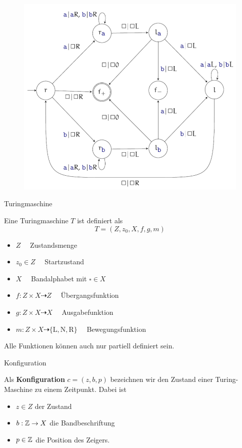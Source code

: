 \begin{frame}
	\vspace{-30pt}
	\begin{figure}[H]
		\centering
		\includegraphics[scale=0.45]{turing/Palindrom}
	\end{figure}
\end{frame}

\begin{frame}{Turingmaschine}
	\begin{Definition}
		Eine Turingmaschine $T$ ist definiert als $$ T = (Z, z_0 , X, f,g, m)$$
		\begin{itemize}[<+->]
			\item $Z \quad$ Zustandsmenge 
			\item $z_0\in Z \quad$ Startzustand
			\item $X \quad$ Bandalphabet mit $\square \in X$
			\item $f:Z\times X \dashrightarrow Z \quad$ Übergangsfunktion
			\item $g:Z\times X\dashrightarrow X \quad$ Ausgabefunktion 
			\item $m:Z\times X \dashrightarrow \{\text{L},\text{N},\text{R}\} \quad$ Bewegungsfunktion
		\end{itemize}
		\pause
		Alle Funktionen können auch nur partiell definiert sein.
	\end{Definition}
\end{frame}


\begin{frame}{Konfiguration}
	\begin{Definition}
		Als \textbf{Konfiguration} $ c =(z,b,p)$ bezeichnen wir den Zustand einer Turing-Maschine zu einem Zeitpunkt. Dabei ist 
		\begin{itemize}
			\item $z\in Z$ der Zustand
			\item $b: \mathbb{Z} \to X$ die Bandbeschriftung
			\item $p\in \mathbb{Z}$ die Position des Zeigers.
		\end{itemize}
	\end{Definition}
\end{frame}

